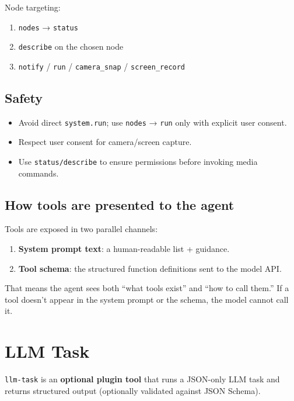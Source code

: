 Node targeting:

\begin{enumerate}
  \item \texttt{nodes} → \texttt{status}
  \item \texttt{describe} on the chosen node
  \item \texttt{notify} / \texttt{run} / \texttt{camera\_snap} / \texttt{screen\_record}
\end{enumerate}


\subsection{Safety}


\begin{itemize}
  \item Avoid direct \texttt{system.run}; use \texttt{nodes} → \texttt{run} only with explicit user consent.
  \item Respect user consent for camera/screen capture.
  \item Use \texttt{status/describe} to ensure permissions before invoking media commands.
\end{itemize}


\subsection{How tools are presented to the agent}


Tools are exposed in two parallel channels:

\begin{enumerate}
  \item \textbf{System prompt text}: a human-readable list + guidance.
  \item \textbf{Tool schema}: the structured function definitions sent to the model API.
\end{enumerate}


That means the agent sees both “what tools exist” and “how to call them.” If a tool
doesn’t appear in the system prompt or the schema, the model cannot call it.


\clearpage

\section{LLM Task}


\texttt{llm-task} is an \textbf{optional plugin tool} that runs a JSON-only LLM task and
returns structured output (optionally validated against JSON Schema).

